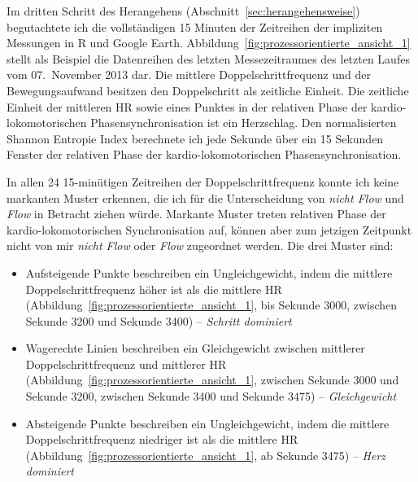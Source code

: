 \label{ssub:prozessorientierter_ansatz_5_1} 
\begin{sidewaysfigure}
	\resizebox{1.00 
	\textwidth}{!}{
	
	 }
	
	\caption[Beispielhafte Prozessdarstellung des letzten Laufabschnittes vom 07. November 2013 (Erste Studie: Laufen)]{Beispielhafte Prozessdarstellung des letzten Laufabschnittes vom 07. November 2013 \\
	\hspace{ 
	\textwidth} \emph{Anmerkung}: Rel. Phase = Relative Phase} \label{fig:prozessorientierte_ansicht_1} 
\end{sidewaysfigure}

Im dritten Schritt des Herangehens (Abschnitt~\ref{sec:herangehensweise}) begutachtete ich die vollständigen 15 Minuten der Zeitreihen der impliziten Messungen in R und Google Earth. Abbildung~\ref{fig:prozessorientierte_ansicht_1} stellt als Beispiel die Datenreihen des letzten Messezeitraumes des letzten Laufes vom 07.~November 2013 dar. Die mittlere Doppelschrittfrequenz und der Bewegungsaufwand besitzen den Doppelschritt als zeitliche Einheit. Die zeitliche Einheit der mittleren \ac{HR} sowie eines Punktes in der relativen Phase der kardio-lokomotorischen Phasensynchronisation ist ein Herzschlag. Den normalisierten Shannon Entropie Index berechnete ich jede Sekunde über ein 15 Sekunden Fenster der relativen Phase der kardio-lokomotorischen Phasensynchronisation. 

In allen 24 15-minütigen Zeitreihen der Doppelschrittfrequenz konnte ich keine markanten Muster erkennen, die ich für die Unterscheidung von \emph{nicht Flow} und \emph{Flow} in Betracht ziehen würde. Markante Muster treten relativen Phase der kardio-lokomotorischen Synchronisation auf, können aber zum jetzigen Zeitpunkt nicht von mir \emph{nicht Flow} oder \emph{Flow} zugeordnet werden. Die drei Muster sind: 
\begin{itemize}
	
	\item Aufsteigende Punkte beschreiben ein Ungleichgewicht, indem die mittlere Doppelschrittfrequenz höher ist als die mittlere \ac{HR} (Abbildung~\ref{fig:prozessorientierte_ansicht_1}, bis Sekunde 3000, zwischen Sekunde 3200 und Sekunde 3400) -- \emph{Schritt dominiert}
	
	\item Wagerechte Linien beschreiben ein Gleichgewicht zwischen mittlerer Doppelschrittfrequenz und mittlerer \ac{HR} (Abbildung~\ref{fig:prozessorientierte_ansicht_1}, zwischen Sekunde 3000 und Sekunde 3200, zwischen Sekunde 3400 und Sekunde 3475) -- \emph{Gleichgewicht}
	
	\item Absteigende Punkte beschreiben ein Ungleichgewicht, indem die mittlere Doppelschrittfrequenz niedriger ist als die mittlere \ac{HR} (Abbildung~\ref{fig:prozessorientierte_ansicht_1}, ab Sekunde 3475) -- \emph{Herz dominiert} 
\end{itemize}

